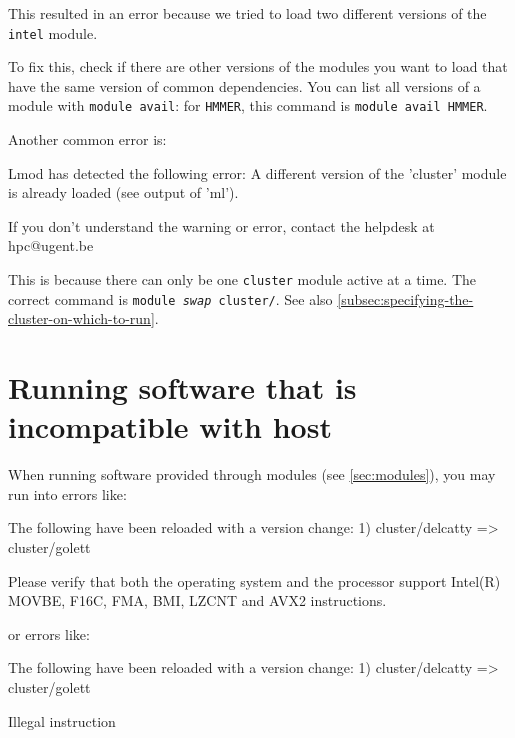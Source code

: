 This resulted in an error because we tried to load two different versions of the
\verb|intel| module.

To fix this, check if there are other versions of the modules you want to load
that have the same version of common dependencies. You can list all versions of
a module with \verb|module avail|: for \verb|HMMER|, this command is \verb|module avail HMMER|.

Another common error is:

\begin{prompt}
Lmod has detected the following error:  A different version of the 'cluster' module is already loaded (see output of 'ml').

If you don't understand the warning or error, contact the helpdesk at hpc@ugent.be
\end{prompt}

This is because there can only be one \verb|cluster| module active at a time.
The correct command is \texttt{module \emph{swap} cluster/\othercluster}. See
also \autoref{subsec:specifying-the-cluster-on-which-to-run}.
\fi

\ifgent

\section{Running software that is incompatible with host}
\label{sec:running-software-incompatible-with-host}

When running software provided through modules (see \autoref{sec:modules}),
you may run into errors like:

\begin{prompt}

The following have been reloaded with a version change:
  1) cluster/delcatty => cluster/golett


Please verify that both the operating system and the processor support Intel(R) MOVBE, F16C, FMA, BMI, LZCNT and AVX2 instructions.

\end{prompt}

or errors like:

\begin{prompt}

The following have been reloaded with a version change:
  1) cluster/delcatty => cluster/golett

Illegal instruction
\end{prompt}


